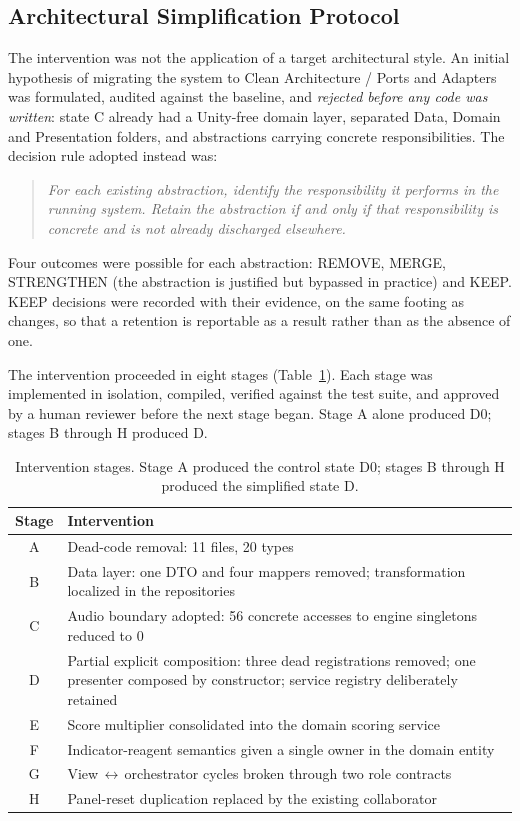 \documentclass{sbc2019}%
\begin{document}
\subsection{Architectural Simplification Protocol}

The intervention was not the application of a target architectural style. An
initial hypothesis of migrating the system to Clean Architecture / Ports and
Adapters was formulated, audited against the baseline, and \emph{rejected before
any code was written}: state C already had a Unity-free domain layer, separated
Data, Domain and Presentation folders, and abstractions carrying concrete
responsibilities. The decision rule adopted instead was:

\begin{quote}
\emph{For each existing abstraction, identify the responsibility it performs in
the running system. Retain the abstraction if and only if that responsibility is
concrete and is not already discharged elsewhere.}
\end{quote}

Four outcomes were possible for each abstraction: REMOVE, MERGE, STRENGTHEN
(the abstraction is justified but bypassed in practice) and KEEP\@. KEEP decisions
were recorded with their evidence, on the same footing as changes, so that a
retention is reportable as a result rather than as the absence of one.

The intervention proceeded in eight stages (Table~\ref{tab:stages}). Each stage
was implemented in isolation, compiled, verified against the test suite, and
approved by a human reviewer before the next stage began. Stage A alone
produced D0; stages B through H produced D.

\begin{table}[htb]
\centering
\caption{Intervention stages. Stage A produced the control state D0; stages B through H
produced the simplified state D.}\label{tab:stages}
\small
\begin{tabular}{cp{}}
\toprule
\textbf{Stage} & \textbf{Intervention} \\
\midrule
A & Dead-code removal: 11 files, 20 types \\
B & Data layer: one DTO and four mappers removed; transformation localized in the repositories \\
C & Audio boundary adopted: 56 concrete accesses to engine singletons reduced to 0 \\
D & Partial explicit composition: three dead registrations removed; one presenter composed by constructor; service registry deliberately retained \\
E & Score multiplier consolidated into the domain scoring service \\
F & Indicator-reagent semantics given a single owner in the domain entity \\
G & View\,$\leftrightarrow$\,orchestrator cycles broken through two role contracts \\
H & Panel-reset duplication replaced by the existing collaborator \\
\bottomrule
\end{tabular}
\end{table}
\end{document}
